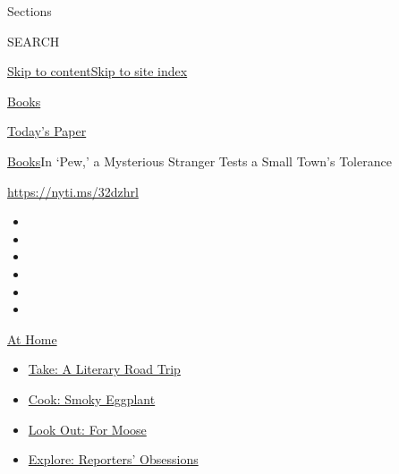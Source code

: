 Sections

SEARCH

\protect\hyperlink{site-content}{Skip to
content}\protect\hyperlink{site-index}{Skip to site index}

\href{https://www.nytimes3xbfgragh.onion/section/books}{Books}

\href{https://myaccount.nytimes3xbfgragh.onion/auth/login?response_type=cookie\&client_id=vi}{}

\href{https://www.nytimes3xbfgragh.onion/section/todayspaper}{Today's
Paper}

\href{/section/books}{Books}\textbar{}In `Pew,' a Mysterious Stranger
Tests a Small Town's Tolerance

\url{https://nyti.ms/32dzhrl}

\begin{itemize}
\item
\item
\item
\item
\item
\item
\end{itemize}

\href{https://www.nytimes3xbfgragh.onion/spotlight/at-home?action=click\&pgtype=Article\&state=default\&region=TOP_BANNER\&context=at_home_menu}{At
Home}

\begin{itemize}
\tightlist
\item
  \href{https://www.nytimes3xbfgragh.onion/2020/07/28/books/time-for-a-literary-road-trip.html?action=click\&pgtype=Article\&state=default\&region=TOP_BANNER\&context=at_home_menu}{Take:
  A Literary Road Trip}
\item
  \href{https://www.nytimes3xbfgragh.onion/2020/07/29/magazine/bored-with-your-home-cooking-some-smoky-eggplant-will-fix-that.html?action=click\&pgtype=Article\&state=default\&region=TOP_BANNER\&context=at_home_menu}{Cook:
  Smoky Eggplant}
\item
  \href{https://www.nytimes3xbfgragh.onion/2020/07/27/travel/moose-michigan-isle-royale.html?action=click\&pgtype=Article\&state=default\&region=TOP_BANNER\&context=at_home_menu}{Look
  Out: For Moose}
\item
  \href{https://www.nytimes3xbfgragh.onion/interactive/2020/at-home/even-more-reporters-editors-diaries-lists-recommendations.html?action=click\&pgtype=Article\&state=default\&region=TOP_BANNER\&context=at_home_menu}{Explore:
  Reporters' Obsessions}
\end{itemize}

